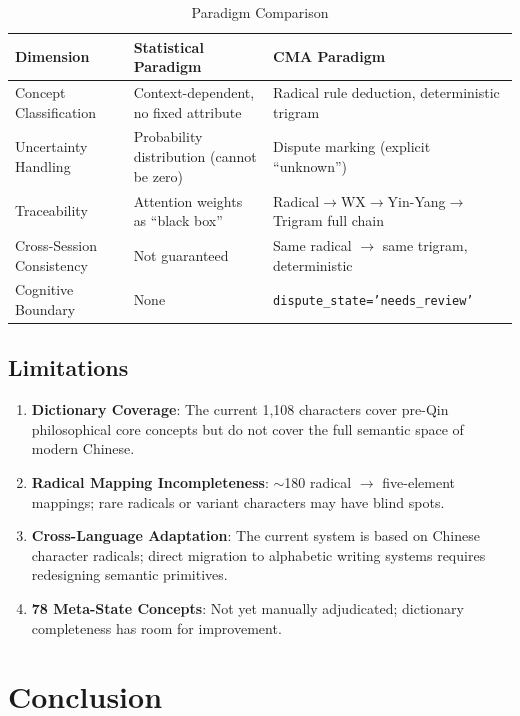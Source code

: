 \documentclass[11pt,a4paper]{article}
\begin{document}
\begin{table}[ht]
\centering
\caption{Paradigm Comparison}
\begin{tabular}{p{3.5cm}p{4cm}p{4cm}}
\toprule
Dimension & Statistical Paradigm & CMA Paradigm \\
\midrule
Concept Classification & Context-dependent, no fixed attribute & Radical rule deduction, deterministic trigram \\
Uncertainty Handling  & Probability distribution (cannot be zero) & Dispute marking (explicit ``unknown'') \\
Traceability          & Attention weights as ``black box'' & Radical$\rightarrow$WX$\rightarrow$Yin-Yang$\rightarrow$Trigram full chain \\
Cross-Session Consistency & Not guaranteed & Same radical $\rightarrow$ same trigram, deterministic \\
Cognitive Boundary    & None & \texttt{dispute\_state='needs\_review'} \\
\bottomrule
\end{tabular}
\end{table}

\subsection{Limitations}

\begin{enumerate}
    \item \textbf{Dictionary Coverage}: The current 1,108 characters cover pre-Qin philosophical core concepts but do not cover the full semantic space of modern Chinese.
    \item \textbf{Radical Mapping Incompleteness}: $\sim$180 radical $\rightarrow$ five-element mappings; rare radicals or variant characters may have blind spots.
    \item \textbf{Cross-Language Adaptation}: The current system is based on Chinese character radicals; direct migration to alphabetic writing systems requires redesigning semantic primitives.
    \item \textbf{78 Meta-State Concepts}: Not yet manually adjudicated; dictionary completeness has room for improvement.
\end{enumerate}

\section{Conclusion}
\end{document}
